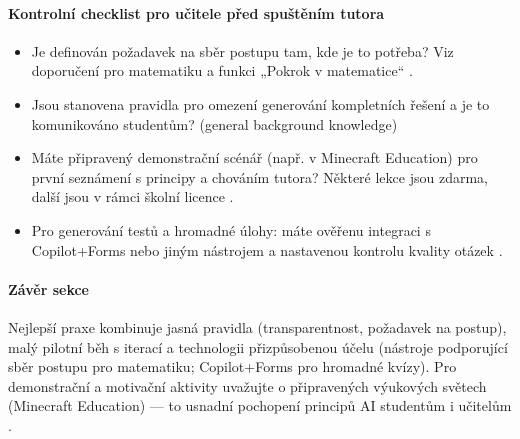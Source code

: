 \paragraph{Kontrolní checklist pro učitele před spuštěním tutora}
\begin{itemize}
  \item Je definován požadavek na sběr postupu tam, kde je to potřeba? Viz doporučení pro matematiku a funkci „Pokrok v matematice“ \cite{kb_ai_101_tipu_pdf_04e4a115_page_8_1}.
  \item Jsou stanovena pravidla pro omezení generování kompletních řešení a je to komunikováno studentům? (general background knowledge)
  \item Máte připravený demonstrační scénář (např. v Minecraft Education) pro první seznámení s principy a chováním tutora? Některé lekce jsou zdarma, další jsou v rámci školní licence \cite{kb_ai_101_tipu_pdf_04e4a115_page_15_2}.
  \item Pro generování testů a hromadné úlohy: máte ověřenu integraci s Copilot+Forms nebo jiným nástrojem a nastavenou kontrolu kvality otázek \cite{kb_ai_101_tipu_pdf_04e4a115_page_36_1}.
\end{itemize}

\paragraph{Závěr sekce}
Nejlepší praxe kombinuje jasná pravidla (transparentnost, požadavek na postup), malý pilotní běh s iterací a technologii přizpůsobenou účelu (nástroje podporující sběr postupu pro matematiku; Copilot+Forms pro hromadné kvízy). Pro demonstrační a motivační aktivity uvažujte o připravených výukových světech (Minecraft Education) — to usnadní pochopení principů AI studentům i učitelům \cite{kb_ai_101_tipu_pdf_04e4a115_page_15_2,kb_ai_101_tipu_pdf_04e4a115_page_36_1,kb_ai_101_tipu_pdf_04e4a115_page_8_1}.